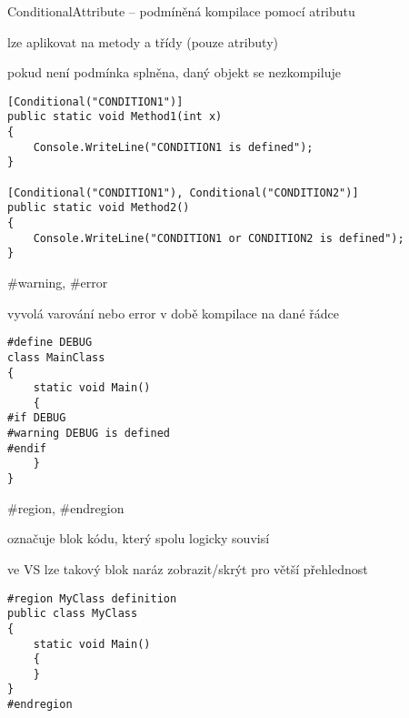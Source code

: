 \begin{frame}[fragile]
\vfill
\begin{bitemize}{ConditionalAttribute -- podmíněná kompilace pomocí atributu}
\item lze aplikovat na metody a třídy (pouze atributy)
\item pokud není podmínka splněna, daný objekt se nezkompiluje
\end{bitemize}
\vfill
\begin{yesblock}
\begin{lstlisting}
[Conditional("CONDITION1")]
public static void Method1(int x)
{
    Console.WriteLine("CONDITION1 is defined");
}

[Conditional("CONDITION1"), Conditional("CONDITION2")]  
public static void Method2()
{
    Console.WriteLine("CONDITION1 or CONDITION2 is defined");
}
\end{lstlisting}
\end{yesblock}
\vfill
\end{frame}



\begin{frame}[fragile]
\vfill
\begin{bitemize}{\#warning, \#error}
\item vyvolá varování nebo error v době kompilace na dané řádce
\end{bitemize}
\vfill
\begin{yesblock}
\begin{lstlisting}[deletekeywords={if,is}]
#define DEBUG  
class MainClass   
{  
    static void Main()   
    {  
#if DEBUG  
#warning DEBUG is defined  
#endif  
    }  
}  
\end{lstlisting}
\end{yesblock}
\vfill
\end{frame}


\begin{frame}[fragile]
\vfill
\begin{bitemize}{\#region, \#endregion}
\item označuje blok kódu, který spolu logicky souvisí
\item ve VS lze takový blok naráz zobrazit/skrýt pro větší přehlednost
\end{bitemize}
\vfill
\begin{yesblock}
\begin{lstlisting}
#region MyClass definition  
public class MyClass   
{  
    static void Main()   
    {  
    }  
}  
#endregion  
\end{lstlisting}
\end{yesblock}
\vfill
\end{frame}

